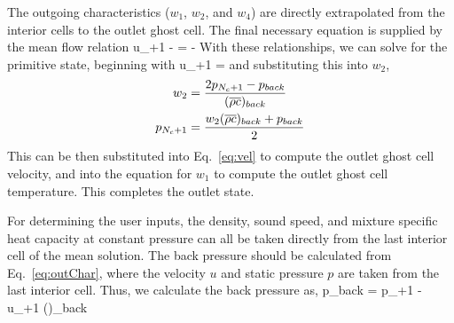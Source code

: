 The outgoing characteristics ($w_1$, $w_2$, and $w_4$) are directly extrapolated from the interior cells to the outlet ghost cell. The final necessary equation is supplied by the mean flow relation
\be\label{eq:outChar}
	u_{\numCells+1} -  = -
\ee
With these relationships, we can solve for the primitive state, beginning with
\be\label{eq:vel}
	u_{\numCells+1} = 
\ee
and substituting this into $w_2$,
\begin{align}
	w_2 &= \frac{2 p_{N_c+1} - p_{back}}{(\overline{\rho c})_{back}} \\
	p_{N_c+1} &= \frac{w_2 (\overline{\rho c})_{back} + p_{back}}{2}
\end{align}
This can be then substituted into Eq.~\ref{eq:vel} to compute the outlet ghost cell velocity, and into the equation for $w_1$ to compute the outlet ghost cell temperature. This completes the outlet state.

For determining the user inputs, the density, sound speed, and mixture specific heat capacity at constant pressure can all be taken directly from the last interior cell of the mean solution. The back pressure should be calculated from Eq.~\ref{eq:outChar}, where the velocity $u$ and static pressure $p$ are taken from the last interior cell. Thus, we calculate the back pressure as,
\be
	p_{back} = p_{\numCells+1} - u_{\numCells+1} ()_{back}
\ee